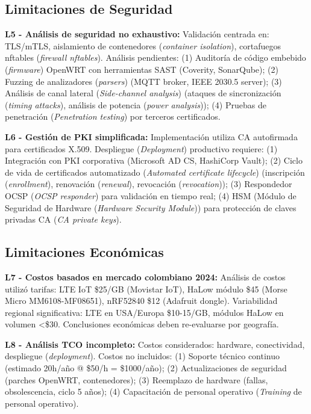 \subsection{Limitaciones de Seguridad}

\textbf{L5 - Análisis de seguridad no exhaustivo:} Validación centrada en: TLS/mTLS, aislamiento de contenedores (\textit{container isolation}), cortafuegos nftables (\textit{firewall nftables}). Análisis pendientes: (1) Auditoría de código embebido (\textit{firmware}) OpenWRT con herramientas SAST (Coverity, SonarQube); (2) Fuzzing de analizadores (\textit{parsers}) (MQTT broker, IEEE 2030.5 server); (3) Análisis de canal lateral (\textit{Side-channel analysis}) (ataques de sincronización (\textit{timing attacks}), análisis de potencia (\textit{power analysis})); (4) Pruebas de penetración (\textit{Penetration testing}) por terceros certificados.

\textbf{L6 - Gestión de PKI simplificada:} Implementación utiliza CA autofirmada para certificados X.509. Despliegue (\textit{Deployment}) productivo requiere: (1) Integración con PKI corporativa (Microsoft AD CS, HashiCorp Vault); (2) Ciclo de vida de certificados automatizado (\textit{Automated certificate lifecycle}) (inscripción (\textit{enrollment}), renovación (\textit{renewal}), revocación (\textit{revocation})); (3) Respondedor OCSP (\textit{OCSP responder}) para validación en tiempo real; (4) HSM (Módulo de Seguridad de Hardware (\textit{Hardware Security Module})) para protección de claves privadas CA (\textit{CA private keys}).

\subsection{Limitaciones Económicas}

\textbf{L7 - Costos basados en mercado colombiano 2024:} Análisis de costos utilizó tarifas: LTE IoT \$25/GB (Movistar IoT), HaLow módulo \$45 (Morse Micro MM6108-MF08651), nRF52840 \$12 (Adafruit dongle). Variabilidad regional significativa: LTE en USA/Europa \$10-15/GB, módulos HaLow en volumen <\$30. Conclusiones económicas deben re-evaluarse por geografía.

\textbf{L8 - Análisis TCO incompleto:} Costos considerados: hardware, conectividad, despliegue (\textit{deployment}). Costos no incluidos: (1) Soporte técnico continuo (estimado 20h/año @ \$50/h = \$1000/año); (2) Actualizaciones de seguridad (parches OpenWRT, contenedores); (3) Reemplazo de hardware (fallas, obsolescencia, ciclo 5 años); (4) Capacitación de personal operativo (\textit{Training} de personal operativo).

